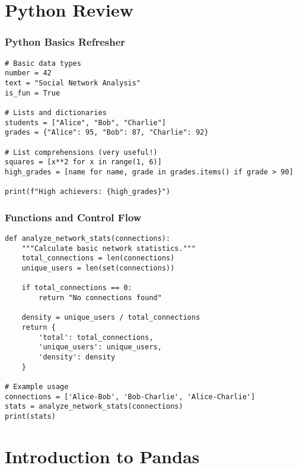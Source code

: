 \documentclass[aspectratio=169]{beamer}
\begin{document}
\section{Python Review}

\begin{frame}[fragile]
\frametitle{Python Basics Refresher}
\begin{lstlisting}[caption=Data Types and Structures]
# Basic data types
number = 42
text = "Social Network Analysis"
is_fun = True

# Lists and dictionaries
students = ["Alice", "Bob", "Charlie"]
grades = {"Alice": 95, "Bob": 87, "Charlie": 92}

# List comprehensions (very useful!)
squares = [x**2 for x in range(1, 6)]
high_grades = [name for name, grade in grades.items() if grade > 90]

print(f"High achievers: {high_grades}")
\end{lstlisting}
\end{frame}

\begin{frame}[fragile]
\frametitle{Functions and Control Flow}
\begin{lstlisting}[caption=Essential Python Patterns]
def analyze_network_stats(connections):
    """Calculate basic network statistics."""
    total_connections = len(connections)
    unique_users = len(set(connections))
    
    if total_connections == 0:
        return "No connections found"
    
    density = unique_users / total_connections
    return {
        'total': total_connections,
        'unique_users': unique_users,
        'density': density
    }

# Example usage
connections = ['Alice-Bob', 'Bob-Charlie', 'Alice-Charlie']
stats = analyze_network_stats(connections)
print(stats)
\end{lstlisting}
\end{frame}

\section{Introduction to Pandas}
\end{document}
